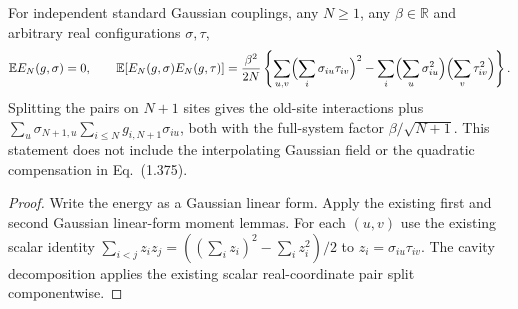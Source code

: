 \begin{lemma}\label{lem:sg-tal:vector-covariance}
\leanok
{}
For independent standard Gaussian couplings, any $N\ge1$, any $\beta\in\mathbb R$ and
arbitrary real configurations $\sigma,\tau$,
\[
\mathbb E E_N(g,\sigma)=0,\qquad
\mathbb E[E_N(g,\sigma)E_N(g,\tau)]
=\frac{\beta^2}{2N}\left\{
\sum_{u,v}\Bigl(\sum_i\sigma_{iu}\tau_{iv}\Bigr)^2
-\sum_i\Bigl(\sum_u\sigma_{iu}^2\Bigr)\Bigl(\sum_v\tau_{iv}^2\Bigr)\right\}.
\]
Splitting the pairs on $N+1$ sites gives the old-site interactions plus
$\sum_u\sigma_{N+1,u}\sum_{i\le N}g_{i,N+1}\sigma_{iu}$, both with the full-system
factor $\beta/\sqrt{N+1}$. This statement does not include the interpolating Gaussian
field or the quadratic compensation in Eq.~(1.375).
\end{lemma}
\begin{proof}
\leanok
Write the energy as a Gaussian linear form. Apply the existing first and second Gaussian
linear-form moment lemmas. For each $(u,v)$ use the existing scalar identity
$\sum_{i<j}z_i z_j=((\sum_i z_i)^2-\sum_i z_i^2)/2$ to $z_i=\sigma_{iu}\tau_{iv}$.
The cavity decomposition applies the existing scalar real-coordinate pair split componentwise.
\end{proof}

